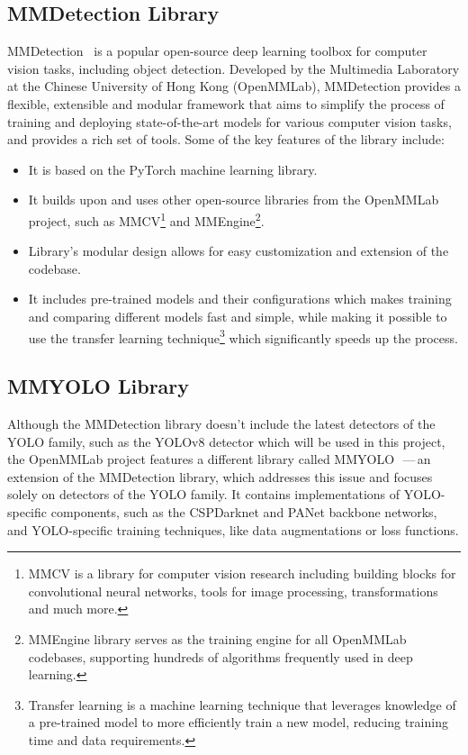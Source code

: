 \subsection{MMDetection Library}

MMDetection~\cite{MMDetection} is a popular open-source deep learning toolbox
for computer vision tasks, including object detection. Developed by the
Multimedia Laboratory at the Chinese University of Hong Kong (OpenMMLab),
MMDetection provides a flexible, extensible and modular framework that aims to
simplify the process of training and deploying state-of-the-art models for
various computer vision tasks, and provides a rich set of tools. Some of the key
features of the library include:

\begin{itemize}
    \item It is based on the PyTorch machine learning library.
    \item It builds upon and uses other open-source libraries from the OpenMMLab
    project, such as MMCV\footnote{MMCV is a library for computer vision
    research including building blocks for convolutional neural networks, tools
    for image processing, transformations and much more.} and
    MMEngine\footnote{MMEngine library serves as the training engine for all
    OpenMMLab codebases, supporting hundreds of algorithms frequently used in
    deep learning.}.
    \item Library's modular design allows for easy customization and extension
    of the codebase.
    \item It includes pre-trained models and their configurations which makes
    training and comparing different models fast and simple, while making it
    possible to use the transfer learning technique\footnote{Transfer learning
    is a machine learning technique that leverages knowledge of a pre-trained
    model to more efficiently train a new model, reducing training time and data
    requirements.} which significantly speeds up the process.
\end{itemize}


\subsection{MMYOLO Library}

Although the MMDetection library doesn't include the latest detectors of the
YOLO family, such as the YOLOv8 detector which will be used in this project, the
OpenMMLab project features a different library called
MMYOLO~\cite{MMYOLO}\,---\,an extension of the MMDetection library, which
addresses this issue and focuses solely on detectors of the YOLO family. It
contains implementations of YOLO-specific components, such as the CSPDarknet and
PANet backbone networks, and YOLO-specific training techniques, like data
augmentations or loss functions.


